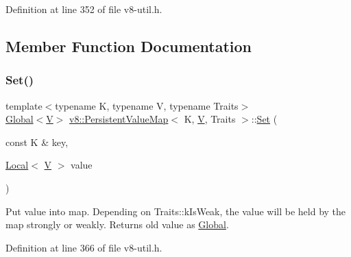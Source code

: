 Definition at line 352 of file v8-\/util.\+h.



\subsection{Member Function Documentation}
\mbox{\label{classv8_1_1PersistentValueMap_a4527a2e1b25a9f1772317f948382d9f9}} 
\subsubsection{\texorpdfstring{Set()}{Set()}\hspace{0.1cm}{\footnotesize\ttfamily [1/3]}}
{\footnotesize\ttfamily template$<$typename K, typename V, typename Traits$>$ \\
\mbox{\hyperlink{classv8_1_1Global}{Global}}$<$\mbox{\hyperlink{classV}{V}}$>$ \mbox{\hyperlink{classv8_1_1PersistentValueMap}{v8\+::\+Persistent\+Value\+Map}}$<$ K, \mbox{\hyperlink{classV}{V}}, Traits $>$\+::\mbox{\hyperlink{classv8_1_1Set}{Set}} (\begin{DoxyParamCaption}\item[{const K \&}]{key,  }\item[{\mbox{\hyperlink{classv8_1_1Local}{Local}}$<$ \mbox{\hyperlink{classV}{V}} $>$}]{value }\end{DoxyParamCaption})\hspace{0.3cm}{\ttfamily [inline]}}

Put value into map. Depending on Traits\+::k\+Is\+Weak, the value will be held by the map strongly or weakly. Returns old value as \mbox{\hyperlink{classv8_1_1Global}{Global}}. 

Definition at line 366 of file v8-\/util.\+h.

\mbox{\label{classv8_1_1PersistentValueMap_a00f89f1b7665698349f98b04d0059180}} 
